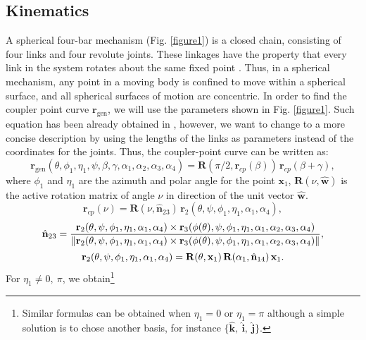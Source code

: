 \documentclass[11pt]{article}
\providecommand{\norm}[1]{\lVert #1\rVert }
\begin{document}
\subsection{Kinematics}
A spherical four-bar mechanism (Fig. \ref{figure1}) is a closed chain, 
consisting of four links and four revolute joints. These linkages have 
the property that every link in the system rotates about the same fixed 
point \cite{McCarthy2000}. Thus, in a spherical mechanism, any point in 
a moving body is confined to move within a spherical surface, and all 
spherical surfaces of motion are concentric. In order to find the 
coupler point curve $\mathbf{r}_{\text{gen}}$, we will use the 
parameters shown in Fig.  \ref{figure1}. Such equation has been already 
obtained in \cite{Penunuri2012}, however, we want to change to a more 
concise description by using the lengths of the links as parameters 
instead of the coordinates for the joints. Thus, the coupler-point curve 
can be written as: 
\begin{equation}\label{rgenx}
{\mathbf r}_{\text{gen}}(\theta,\phi_1,\eta_1,\psi,\beta,\gamma,
\alpha_1,\alpha_2,\alpha_3,\alpha_4)={\mathbf R}\left(\pi /2,
{\mathbf r}_{cp}(\beta)\right)\, {\mathbf r}_{cp}(\beta +\gamma),
\end{equation}
where $\phi_1$ and $\eta_1$ are the azimuth and polar angle for the 
point $\mathbf{x}_1$, ${\mathbf R}(\nu,\hat{\mathbf{w}})$ is the active 
rotation matrix of angle $\nu$ in direction of the unit vector 
$\hat{\mathbf{w}}$.
\begin{equation}\label{couplerpoint}
{\mathbf r}_{cp}(\nu) ={\mathbf R}(\nu,\hat{{\mathbf n}}_{23})\,
{\mathbf r}_2(\theta,\psi,\phi_1,\eta_1,\alpha_1,\alpha_4),
\end{equation}
\begin{equation}\label{n23}
\hat{\bf{n}}_{23}=\dfrac{{\mathbf r}_2(\theta,\psi,\phi_1,\eta_1,
\alpha_1,\alpha_4) \times {\mathbf r}_3 (\phi(\theta),\psi,\phi_1,
\eta_1,\alpha_1,\alpha_2,\alpha_3,\alpha_4)} 
{\norm{{\mathbf r}_2(\theta,\psi,\phi_1,\eta_1,\alpha_1,\alpha_4) \times 
{\mathbf r}_3 (\phi(\theta),\psi,\phi_1,\eta_1,\alpha_1,\alpha_2,
\alpha_3,\alpha_4)}},
\end{equation}
\begin{equation}\label{r2}
 {\mathbf r}_2(\theta,\psi,\phi_1,\eta_1,\alpha_1,\alpha_4) ={\mathbf R}
 (\theta,{\mathbf x}_1)\,\mathbf{R}(\alpha_1,\hat{\bf{n}}_{14})\,
 \mathbf{x}_1.
\end{equation}
For $\eta_1\neq 0,~ \pi$, we obtain\footnote{Similar formulas can be 
obtained when $\eta_1 = 0$ or $\eta_1 = \pi$ although a simple solution 
is to chose another basis, for instance $\lbrace\hat{\mathbf{k}},~
\hat{\mathbf{i}},~\hat{\mathbf{j}}\rbrace$.}
\end{document}
